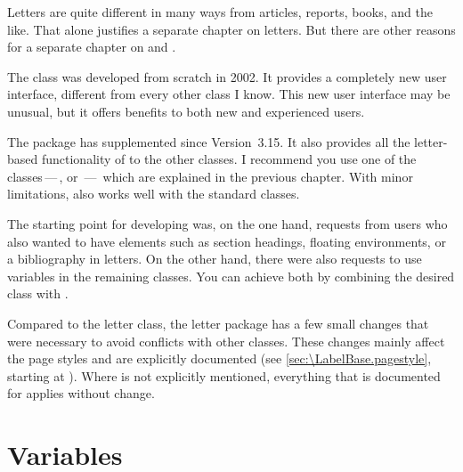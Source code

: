 \BeginIndexGroup
{}%
%
Letters are quite different in many ways from articles, reports, books, and
the like. That alone justifies a separate chapter on letters. But there are
other reasons for a separate chapter on  and
.

The  class was developed from
scratch in 2002. It provides a completely new user interface, different from
every other class I know. This new user interface may be unusual, but it
offers benefits to both new and experienced {\KOMAScript} users.

The %
 package has supplemented \KOMAScript{}
since Version~3.15. It also provides all the letter-based functionality of
 to the other classes. I recommend you use one of the
\KOMAScript{} classes\,---\,,  or
\,---\, which are explained in the previous chapter. With
minor limitations,  also works well with the standard
classes.

The starting point for developing  was, on the one hand,
requests from users who also wanted to have elements such as
section headings, floating
environments, or a bibliography in letters. On the other hand, there were also
requests to use  variables in the remaining \KOMAScript{}
classes. You can achieve both by combining the desired \KOMAScript{} class
with .

Compared to the letter class, the letter package has a few small changes that
were necessary to avoid conflicts with other classes. These changes mainly
affect the page styles and are explicitly documented (see
\autoref{sec:\LabelBase.pagestyle}, starting at
). Where  is not
explicitly mentioned, everything that is documented for 
applies without change.


\section{Variables}
%
\BeginIndexGroup
{}

